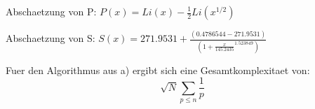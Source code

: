 \documentclass{article}
\begin{document}
Abschaetzung von P:
$P(x) = Li(x) - \frac{1}{2}Li(x^{1/2})$

Abschaetzung von S:
$S(x) = 271.9531 + \frac{(0.4786544 - 271.9531)}{(1 + \frac{x}{145.2435}^{1.523849})}$

Fuer den Algorithmus aus a) ergibt sich eine Gesamtkomplexitaet von: $$\sqrt{N}\sum_{p \leq n} \frac{1}{p}$$
\end{document}
